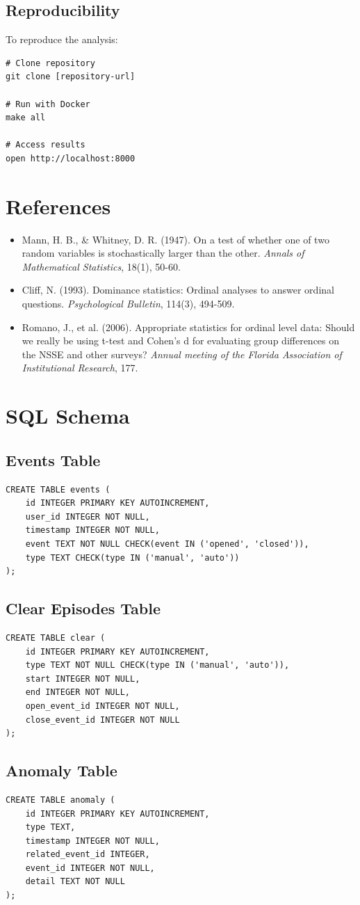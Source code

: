 \documentclass[12pt,a4paper]{article}
\begin{document}
\subsection{Reproducibility}
To reproduce the analysis:
\begin{verbatim}
# Clone repository
git clone [repository-url]

# Run with Docker
make all

# Access results
open http://localhost:8000
\end{verbatim}

\section{References}
\begin{itemize}
    \item Mann, H. B., \& Whitney, D. R. (1947). On a test of whether one of two random variables is stochastically larger than the other. \textit{Annals of Mathematical Statistics}, 18(1), 50-60.
    \item Cliff, N. (1993). Dominance statistics: Ordinal analyses to answer ordinal questions. \textit{Psychological Bulletin}, 114(3), 494-509.
    \item Romano, J., et al. (2006). Appropriate statistics for ordinal level data: Should we really be using t-test and Cohen's d for evaluating group differences on the NSSE and other surveys? \textit{Annual meeting of the Florida Association of Institutional Research}, 177.
\end{itemize}

\appendix
\section{SQL Schema}

\subsection{Events Table}
\begin{verbatim}
CREATE TABLE events (
    id INTEGER PRIMARY KEY AUTOINCREMENT,
    user_id INTEGER NOT NULL,
    timestamp INTEGER NOT NULL,
    event TEXT NOT NULL CHECK(event IN ('opened', 'closed')),
    type TEXT CHECK(type IN ('manual', 'auto'))
);
\end{verbatim}

\subsection{Clear Episodes Table}
\begin{verbatim}
CREATE TABLE clear (
    id INTEGER PRIMARY KEY AUTOINCREMENT,
    type TEXT NOT NULL CHECK(type IN ('manual', 'auto')),
    start INTEGER NOT NULL,
    end INTEGER NOT NULL,
    open_event_id INTEGER NOT NULL,
    close_event_id INTEGER NOT NULL
);
\end{verbatim}

\subsection{Anomaly Table}
\begin{verbatim}
CREATE TABLE anomaly (
    id INTEGER PRIMARY KEY AUTOINCREMENT,
    type TEXT,
    timestamp INTEGER NOT NULL,
    related_event_id INTEGER,
    event_id INTEGER NOT NULL,
    detail TEXT NOT NULL
);
\end{verbatim}
\end{document}
